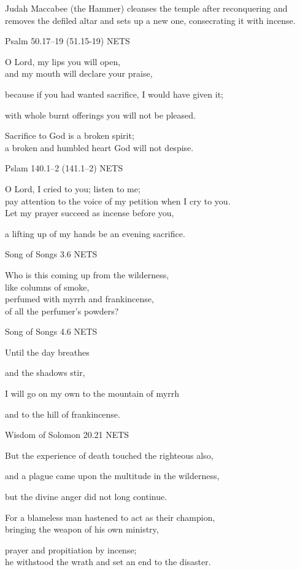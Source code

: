 \documentclass[
]{article}
\newcommand{\RL}[1]{\beginR #1\endR}
\begin{document}
Judah Maccabee (the Hammer) cleanses the temple after reconquering and
removes the defiled altar and sets up a new one, consecrating it with
incense.

Psalm 50.17--19 (51.15-19) NETS

O Lord, my lips you will open,\\
and my mouth will declare your praise,

because if you had wanted sacrifice, I would have given it;

with whole burnt offerings you will not be pleased.

Sacrifice to God is a broken spirit;\\
a broken and humbled heart God will not despise.

Pslam 140.1--2 (141.1--2) NETS

O Lord, I cried to you; listen to me;\\
pay attention to the voice of my petition when I cry to you.\\
Let my prayer succeed as incense before you,

a lifting up of my hands be an evening sacrifice.

Song of Songs 3.6 NETS

Who is this coming up from the wilderness,\\
like columns of smoke,\\
perfumed with myrrh and frankincense,\\
of all the perfumer\RL{'}s powders?

Song of Songs 4.6 NETS

Until the day breathes

and the shadows stir,

I will go on my own to the mountain of myrrh

and to the hill of frankincense.

Wisdom of Solomon 20.21 NETS

But the experience of death touched the righteous also,

and a plague came upon the multitude in the wilderness,

but the divine anger did not long continue.

For a blameless man hastened to act as their champion,\\
bringing the weapon of his own ministry,

prayer and propitiation by incense;\\
he withstood the wrath and set an end to the disaster.
\end{document}
